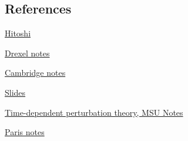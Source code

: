\subsection{References}

\begin{thebibliography}

\href{http://hitoshi.berkeley.edu/221a/timedependent.pdf}{Hitoshi}

\href{http://www.physics.drexel.edu/~bob/Chapters/time_dep_pt.pdf}{Drexel notes}

\href{http://www.tcm.phy.cam.ac.uk/~bds10/aqp/handout_dep.pdf}{Cambridge notes}

\href{http://www.tcm.phy.cam.ac.uk/~bds10/aqp/lec18.pdf}{Slides}


\href{http://www.pa.msu.edu/~mmoore/TDPT.pdf}{Time-dependent perturbation theory, MSU Notes}

\href{http://web.mst.edu/~parris/QuantumTwo/Class_Notes/TDPT.pdf}{Paris notes}

\end{thebibliography}
